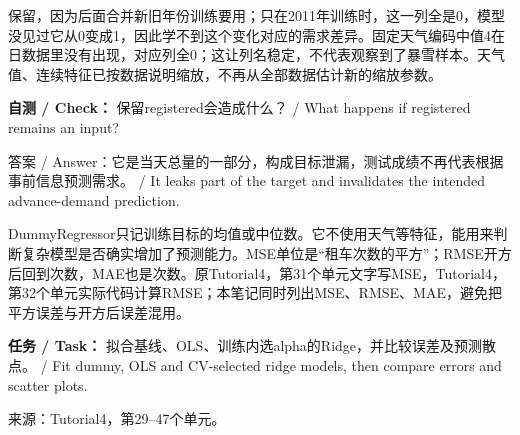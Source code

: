 



保留，因为后面合并新旧年份训练要用；只在2011年训练时，这一列全是0，模型没见过它从0变成1，因此学不到这个变化对应的需求差异。固定天气编码中值4在日数据里没有出现，对应列全0；这让列名稳定，不代表观察到了暴雪样本。天气值、连续特征已按数据说明缩放，不再从全部数据估计新的缩放参数。


\textbf{自测 / Check：} 保留registered会造成什么？ / What happens if registered remains an input?


答案 / Answer：它是当天总量的一部分，构成目标泄漏，测试成绩不再代表根据事前信息预测需求。 / It leaks part of the target and invalidates the intended advance-demand prediction.













DummyRegressor只记训练目标的均值或中位数。它不使用天气等特征，能用来判断复杂模型是否确实增加了预测能力。MSE单位是“租车次数的平方”；RMSE开方后回到次数，MAE也是次数。原Tutorial4，第31个单元文字写MSE，Tutorial4，第32个单元实际代码计算RMSE；本笔记同时列出MSE、RMSE、MAE，避免把平方误差与开方后误差混用。


\textbf{任务 / Task：} 拟合基线、OLS、训练内选alpha的Ridge，并比较误差及预测散点。 / Fit dummy, OLS and CV-selected ridge models, then compare errors and scatter plots.


来源：Tutorial4，第29–47个单元。












